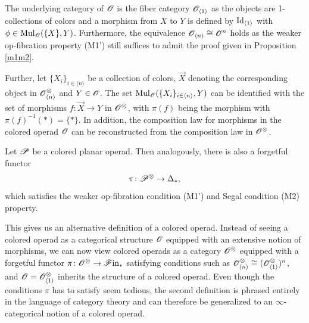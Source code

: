 The underlying category of $\O$ is the fiber category $\O_{\langle 1 \rangle}$
as the objects are 1-collections of colors and a morphism from $X$ to $Y$ is
defined by $\id_{\langle 1 \rangle}$ with $\phi \in \Mul_{\O}(\{X\}, Y)$.
Furthermore, the equivalence $\O_{\langle n \rangle} \cong \O^n$ holds as the
weaker op-fibration property (M1') still suffices to admit the proof given in
Proposition \ref{m1m2}. 

Further, let $\{X_i\}_{i \in \langle n \rangle}$ be a collection of colors,
$\Vec{X}$ denoting the corresponding object in $\Ox_{\langle n \rangle}$ and $Y
\in \O$. The set $\Mul_{\O}(\{X_i\}_{i \in \langle n \rangle}, Y)$ can be
identified with the set of morphisms $f \colon \Vec{X} \to Y$ in $\Ox$, with
$\pi(f)$ being the morphism with $\pi(f)^{-1} (\ast)= \{ \ast \}$. In addition,
the composition law for morphisms in the colored operad $\O$ can be
reconstructed from the composition law in $\Ox$.

\begin{rem}
    Let $\P$ be a colored planar operad. Then analogously, there is also a
    forgetful functor
    \[
        \pi \colon \P^{\otimes} \to \deltast,
    \]
    which satisfies the weaker op-fibration condition (M1') and Segal condition
    (M2) property.
\end{rem}


This gives us an alternative definition of a colored operad. Instead of seeing a
colored operad as a categorical structure $\O$ equipped with an extensive notion
of morphisms, we can now view colored operads as a category $\Ox$ equipped with
a forgetful functor $\pi \colon \Ox \to \Fin$ satisfying conditions such as
$\Ox_{\langle n \rangle} \cong (\Ox_{\langle 1 \rangle})^n$, and $\O =
\Ox_{\langle 1 \rangle}$ inherits the structure of a colored operad. Even though
the conditions $\pi$ has to satisfy seem tedious, the second definition is
phrased entirely in the language of category theory and can therefore be
generalized to an $\infty$-categorical notion of a colored operad. 



